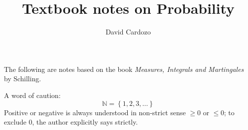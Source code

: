 \documentclass[notitlepage]{report}
\author{David Cardozo}
\title{Textbook notes on Probability}
\newcommand{\NN}{\mathbb{N}}
\newcommand{\set}[1]{\left\lbrace #1 \right\rbrace}
\begin{document}
\maketitle
The following are notes based on the book \textit{Measures, Integrals and Martingales} by Schilling.

A word of caution:
\[ \NN = \set{1,2,3, \ldots}  \]
Positive or negative is always understood in non-strict sense $ \geq 0 $ or $ \leq 0 $; to exclude $0$, the author explicitly says strictly.



	
\end{document}
